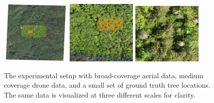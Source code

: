 \begin{figure}
    \centering
    \includegraphics[width=0.3\textwidth]{figs/methods/tree_detection/multiscale_outset.png}
    \includegraphics[width=0.3\textwidth]{figs/methods/tree_detection/multiscale_inset.png}
    \includegraphics[width=0.3\textwidth]{figs/methods/tree_detection/multiscale_in_inset.png}
    \caption{The experimental setup with broad-coverage aerial data, medium coverage drone data, and a small set of ground truth tree locations. The same data is visualized at three different scales for clarity.}
    \label{fig:methods:multi_scale_tree_det}
\end{figure}

